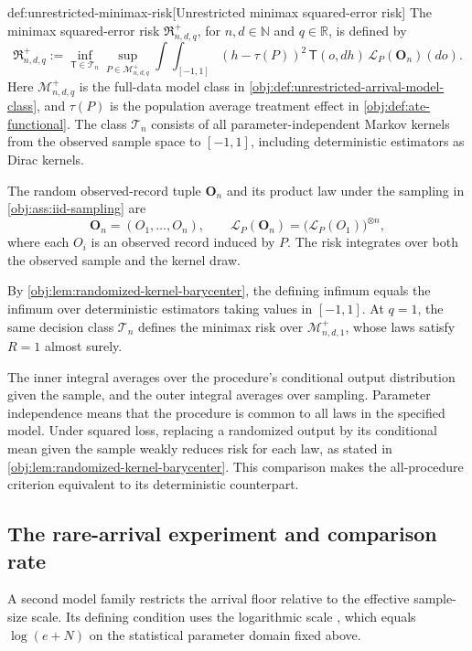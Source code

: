 \begin{definitionv}{def:unrestricted-minimax-risk}[Unrestricted minimax squared-error risk]
The minimax squared-error risk \(\mathfrak R^{+}_{n,d,q}\), for \(n,d\in\mathbb N\) and \(q\in\mathbb R\), is defined by
\[
\mathfrak R^{+}_{n,d,q}
:=
\inf_{\mathsf T\in\mathcal T_n}
\sup_{P\in\mathcal M^{+}_{n,d,q}}
\int\!\int_{[-1,1]}
(h-\tau(P))^2\,
\mathsf T(o,dh)\,
\mathcal L_P(\mathbf O_n)(do).
\]
Here \(\mathcal M^{+}_{n,d,q}\) is the full-data model class in \cref{obj:def:unrestricted-arrival-model-class}, and \(\tau(P)\) is the population average treatment effect in \cref{obj:def:ate-functional}. The class \(\mathcal T_n\) consists of all parameter-independent Markov kernels from the observed sample space to \([-1,1]\), including deterministic estimators as Dirac kernels.

The random observed-record tuple \(\mathbf O_n\) and its product law under the sampling in \cref{obj:ass:iid-sampling} are
\[
\mathbf O_n=(O_1,\ldots,O_n),
\qquad
\mathcal L_P(\mathbf O_n)
=
\bigl(\mathcal L_P(O_1)\bigr)^{\otimes n},
\]
where each \(O_i\) is an observed record induced by \(P\). The risk integrates over both the observed sample and the kernel draw.

By \cref{obj:lem:randomized-kernel-barycenter}, the defining infimum equals the infimum over deterministic estimators taking values in \([-1,1]\). At \(q=1\), the same decision class \(\mathcal T_n\) defines the minimax risk over \(\mathcal M^{+}_{n,d,1}\), whose laws satisfy \(R=1\) almost surely.
\end{definitionv}

The inner integral averages over the procedure's conditional output distribution given the sample, and the outer integral averages over sampling. Parameter independence means that the procedure is common to all laws in the specified model. Under squared loss, replacing a randomized output by its conditional mean given the sample weakly reduces risk for each law, as stated in \cref{obj:lem:randomized-kernel-barycenter}. This comparison makes the all-procedure criterion equivalent to its deterministic counterpart.

\subsection{The rare-arrival experiment and comparison rate}

A second model family restricts the arrival floor relative to the effective sample-size scale. Its defining condition uses the logarithmic scale , which equals \(\log(e+N)\) on the statistical parameter domain fixed above.

